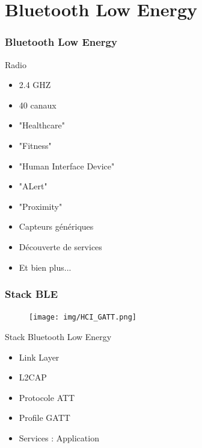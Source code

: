 \section{Bluetooth Low Energy}

\begin{frame}
	\frametitle{Bluetooth Low Energy}
	\begin{minipage}[t]{0.30\linewidth}
		\vspace{0.5cm}
		\begin{block}{Radio}
			\begin{itemize}
				\item 2.4 GHZ
				\item 40 canaux
			\end{itemize}
		\end{block}
	\end{minipage}
	\begin{minipage}[t]{0.66\linewidth}
		\vspace{0.5cm}
		\vspace{0.5cm}
		\begin{itemize}
			\item "Healthcare"
			\item "Fitness"
			\item "Human Interface Device"
			\item "ALert"
			\item "Proximity"
			\item Capteurs génériques
			\item Découverte de services
			\item Et bien plus...
		\end{itemize}
	\end{minipage}
\end{frame}

\begin{frame}
	\frametitle{Stack BLE}
	\begin{minipage}{0.45\linewidth}
		\begin{figure}
			\texttt{[image: img/HCI\_GATT.png]}
		\end{figure}
	\end{minipage}
	\begin{minipage}{0.50\linewidth}
		\begin{block}{Stack Bluetooth Low Energy}
			\begin{itemize}
				\item Link Layer
				\item L2CAP
				\item Protocole ATT
				\item Profile GATT
				\item Services : Application
			\end{itemize}
		\end{block}
	\end{minipage}
\end{frame}

